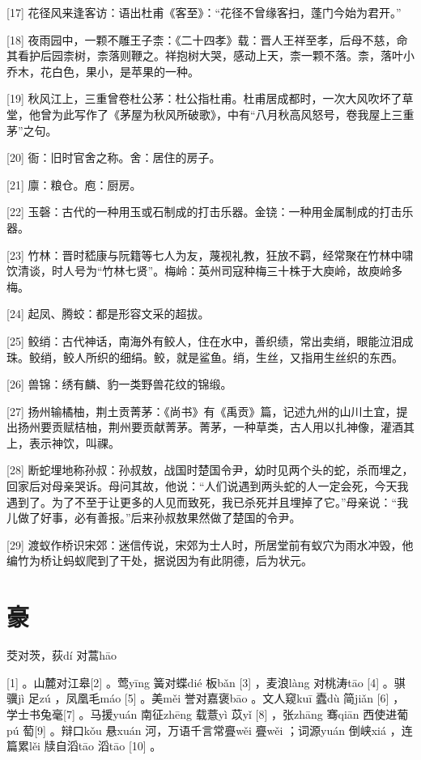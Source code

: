 \documentclass[12pt,UTF8]{ctexbook}
\begin{document}
[17] 花径风来逢客访：语出杜甫《客至》：“花径不曾缘客扫，蓬门今始为君开。”

[18] 夜雨园中，一颗不雕王子柰：《二十四孝》载：晋人王祥至孝，后母不慈，命其看护后园柰树，柰落则鞭之。祥抱树大哭，感动上天，柰一颗不落。柰，落叶小乔木，花白色，果小，是苹果的一种。

[19] 秋风江上，三重曾卷杜公茅：杜公指杜甫。杜甫居成都时，一次大风吹坏了草堂，他曾为此写作了《茅屋为秋风所破歌》，中有“八月秋高风怒号，卷我屋上三重茅”之句。

[20] 衙：旧时官舍之称。舍：居住的房子。

[21] 廪：粮仓。庖：厨房。

[22] 玉磬：古代的一种用玉或石制成的打击乐器。金铙：一种用金属制成的打击乐器。

[23] 竹林：晋时嵇康与阮籍等七人为友，蔑视礼教，狂放不羁，经常聚在竹林中啸饮清谈，时人号为“竹林七贤”。梅岭：英州司寇种梅三十株于大庾岭，故庾岭多梅。

[24] 起凤、腾蛟：都是形容文采的超拔。

[25] 鲛绡：古代神话，南海外有鲛人，住在水中，善织绩，常出卖绡，眼能泣泪成珠。鲛绡，鲛人所织的细绢。鲛，就是鲨鱼。绡，生丝，又指用生丝织的东西。

[26] 兽锦：绣有麟、豹一类野兽花纹的锦缎。

[27] 扬州输橘柚，荆土贡菁茅：《尚书》有《禹贡》篇，记述九州的山川土宜，提出扬州要贡赋桔柚，荆州要贡献菁茅。菁茅，一种草类，古人用以扎神像，灌酒其上，表示神饮，叫祼。

[28] 断蛇埋地称孙叔：孙叔敖，战国时楚国令尹，幼时见两个头的蛇，杀而埋之，回家后对母亲哭诉。母问其故，他说：“人们说遇到两头蛇的人一定会死，今天我遇到了。为了不至于让更多的人见而致死，我已杀死并且埋掉了它。”母亲说：“我儿做了好事，必有善报。”后来孙叔敖果然做了楚国的令尹。

[29] 渡蚁作桥识宋郊：迷信传说，宋郊为士人时，所居堂前有蚁穴为雨水冲毁，他编竹为桥让蚂蚁爬到了干处，据说因为有此阴德，后为状元。





\chapter{豪}


茭对茨，荻dí 对蒿hāo





[1] 。山麓对江皋[2] 。莺yīng 簧对蝶dié 板bǎn [3] ，麦浪làng 对桃涛tāo [4] 。骐骥jì 足zú ，凤凰毛máo [5] 。美měi 誉对嘉褒bāo 。文人窥kuī 蠹dù 简jiǎn [6] ，学士书兔毫[7] 。马援yuán 南征zhēng 载薏yì 苡yǐ [8] ，张zhāng 骞qiān 西使进葡pú 萄[9] 。辩口kǒu 悬xuán 河，万语千言常亹wěi 亹wěi ；词源yuán 倒峡xiá ，连篇累lěi 牍自滔tāo 滔tāo [10] 。
\end{document}
